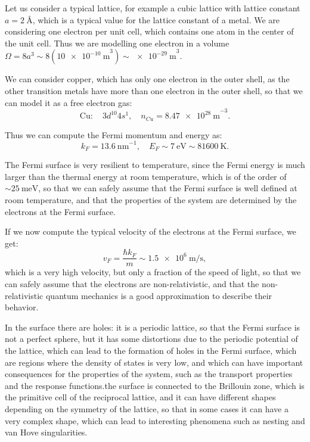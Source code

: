 \begin{example}
    Let us consider a typical lattice, for example a cubic lattice with lattice constant \(a = \SI{2}{\angstrom}\), which is a typical value for the lattice constant of a metal. We are considering one electron per unit cell, which contains one atom in the center of the unit cell. Thus we are modelling one electron in a volume \(\Omega = 8a^3 \sim 8 (\SI{10e-10}{\meter}^3) \sim \SI{e-29}{\meter}^3\).

    We can consider copper, which has only one electron in the outer shell, as the other transition metals have more than one electron in the outer shell, so that we can model it as a free electron gas:
    \[
        \mathrm{Cu} : \quad 3d^{10} 4s^1, \quad n_{Cu} = \SI{8.47e28}{\meter}^{-3}.
    \]

    Thus we can compute the Fermi momentum and energy as:
    \[
        k_F = \SI{13.6}{\nano\meter}^{-1}, \quad E_F \sim \SI{7}{\electronvolt} \sim \SI{81600}{\kelvin}.
    \]

    The Fermi surface is very resilient to temperature, since the Fermi energy is much larger than the thermal energy at room temperature, which is of the order of \(\sim \SI{25}{\milli\electronvolt}\), so that we can safely assume that the Fermi surface is well defined at room temperature, and that the properties of the system are determined by the electrons at the Fermi surface.

    If we now compute the typical velocity of the electrons at the Fermi surface, we get:
    \[
        v_F = \frac{\hbar k_F}{m} \sim \SI{1.5e6}{\meter\per\second},
    \]
    which is a very high velocity, but only a fraction of the speed of light, so that we can safely assume that the electrons are non-relativistic, and that the non-relativistic quantum mechanics is a good approximation to describe their behavior.

    In the surface there are holes: it is a periodic lattice, so that the Fermi surface is not a perfect sphere, but it has some distortions due to the periodic potential of the lattice, which can lead to the formation of holes in the Fermi surface, which are regions where the density of states is very low, and which can have important consequences for the properties of the system, such as the transport properties and the response functions.the surface is connected to the Brillouin zone, which is the primitive cell of the reciprocal lattice, and it can have different shapes depending on the symmetry of the lattice, so that in some cases it can have a very complex shape, which can lead to interesting phenomena such as nesting and van Hove singularities.
\end{example}





